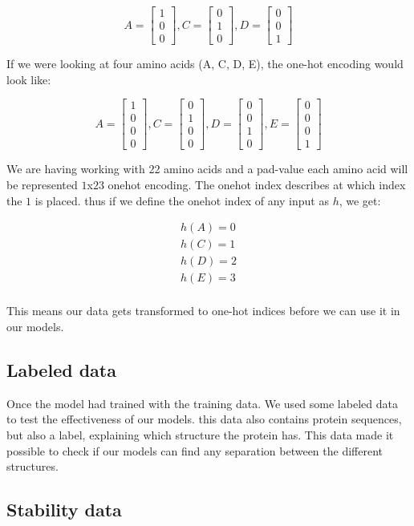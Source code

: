 $$
A = \begin{bmatrix}
1 \\
0 \\
0
\end{bmatrix},
C = \begin{bmatrix}
0 \\
1 \\
0
\end{bmatrix},
D= \begin{bmatrix}
0 \\
0 \\
1
\end{bmatrix}
$$

If we were looking at four amino acids (A, C, D, E), the one-hot encoding would look like:

$$
A = \begin{bmatrix}
1 \\
0 \\
0 \\
0
\end{bmatrix},
C = \begin{bmatrix}
0 \\
1 \\
0 \\
0
\end{bmatrix},
D= \begin{bmatrix}
0 \\
0 \\
1 \\
0
\end{bmatrix},
E= \begin{bmatrix}
0 \\
0 \\
0 \\
1
\end{bmatrix}
$$

We are having working with 22 amino acids and a pad-value each amino acid will be represented $1$x$23$ onehot encoding. The onehot index describes at which index the $1$ is placed. thus if we define the onehot index of any input as $h$, we get:

\begin{align}
h(A) = 0 \\
h(C) = 1 \\
h(D) = 2 \\
h(E) = 3 \\
\end{align}

This means our data gets transformed to one-hot indices before we can use it in our models.

\subsection{Labeled data}
Once the model had trained with the training data. We used some labeled data to test the effectiveness of our models. this data also contains protein sequences, but also a label, explaining which structure the protein has. This data made it possible to check if our models can find any separation between the different structures.


\subsection{Stability data}
